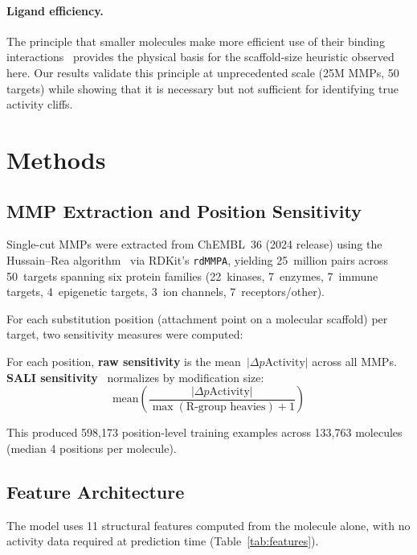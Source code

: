\documentclass[sigconf, nonacm]{acmart}
\begin{document}
\paragraph{Ligand efficiency.} The principle that smaller molecules make more efficient use of their binding interactions~\cite{Hopkins2004} provides the physical basis for the scaffold-size heuristic observed here. Our results validate this principle at unprecedented scale (25M MMPs, 50 targets) while showing that it is necessary but not sufficient for identifying true activity cliffs.

\section{Methods}

\subsection{MMP Extraction and Position Sensitivity}

Single-cut MMPs were extracted from ChEMBL~36 (2024 release) using the Hussain--Rea algorithm~\cite{Hussain2010} via RDKit's \texttt{rdMMPA}, yielding 25~million pairs across 50~targets spanning six protein families (22~kinases, 7~enzymes, 7~immune targets, 4~epigenetic targets, 3~ion channels, 7~receptors/other).

For each substitution position (attachment point on a molecular scaffold) per target, two sensitivity measures were computed:

For each position, \textbf{raw sensitivity} is the mean~$|\Delta p\mathrm{Activity}|$ across all MMPs. \textbf{SALI sensitivity}~\cite{Guha2008} normalizes by modification size:
\begin{equation*}
  \text{mean}\!\left(\frac{|\Delta p\mathrm{Activity}|}
       {\max(\text{R-group heavies}) + 1}\right)
\end{equation*}

This produced 598{,}173 position-level training examples across 133{,}763 molecules (median 4 positions per molecule).

\subsection{Feature Architecture}

The model uses 11 structural features computed from the molecule alone, with no activity data required at prediction time (Table~\ref{tab:features}).
\end{document}
